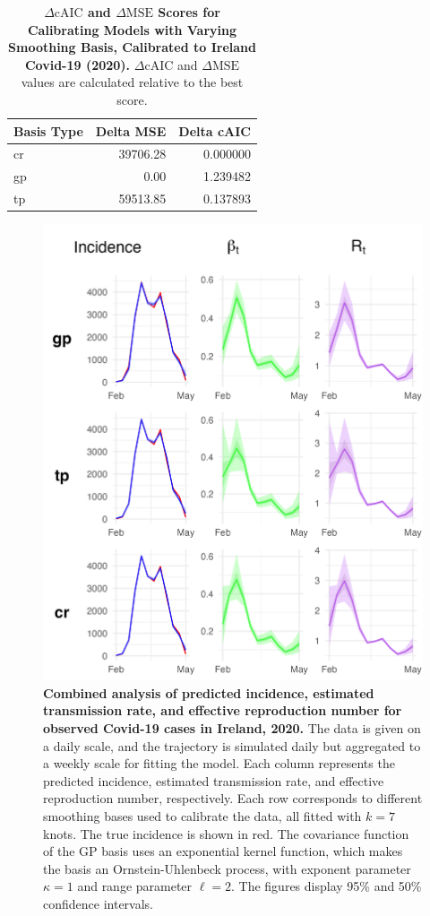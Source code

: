 \documentclass[
11pt, %
oneside, %
english, %
singlespacing, %
]{macthesis} %
\begin{document}
\begin{table}[!h]
\centering
\caption{\label{tab:aic-table-ireland}\textbf{\(\Delta \text{cAIC}\) and \(\Delta \text{MSE}\) Scores for Calibrating Models with Varying Smoothing Basis, Calibrated to Ireland Covid-19 (2020).} \(\Delta \text{cAIC}\) and \(\Delta \text{MSE}\) values are calculated relative to the best score.}
\centering
\begin{tabular}[t]{lrr}
\toprule
Basis Type & Delta MSE & Delta cAIC\\
\midrule
cr & 39706.28 & 0.000000\\
gp & 0.00 & 1.239482\\
tp & 59513.85 & 0.137893\\
\bottomrule
\end{tabular}
\end{table}

\begin{figure}[H]
\centering
\includegraphics[width=\textwidth, height = \textwidth]{figure/Ireland/ireland_combined.png}
\caption[Combined Analysis of Covid-19 in Ireland (2020)]{\textbf{Combined analysis of predicted incidence, estimated transmission rate, and effective reproduction number for observed Covid-19 cases in Ireland, 2020.} The data is given on a daily scale, and the trajectory is simulated daily but aggregated to a weekly scale for fitting the model. Each column represents the predicted incidence, estimated transmission rate, and effective reproduction number, respectively. Each row corresponds to different smoothing bases used to calibrate the data, all fitted with \(k=7\) knots. The true incidence is shown in red. The covariance function of the GP basis uses an exponential kernel function, which makes the basis an Ornstein-Uhlenbeck process, with exponent parameter \(\kappa = 1\) and range parameter \(\ell = 2\). The figures display 95\% and 50\% confidence intervals.}
\label{fig:ireland_combined}
\end{figure}
\end{document}
